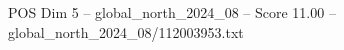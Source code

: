 \begin{textsample}{POS Dim 5 – global\_north\_2024\_08 – Score 11.00 – global\_north\_2024\_08/112003953.txt}
\end{textsample}

